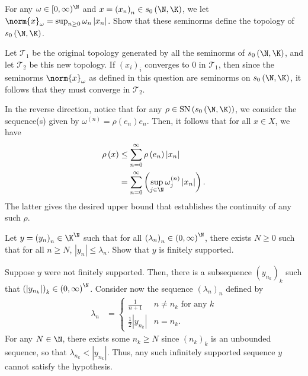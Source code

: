 \documentclass[10pt]{mypackage}
\begin{document}
\begin{problem}[Problem II.6]
  For any $\omega\in [0,\infty)^{\N}$ and $x = \left( x_n \right)_n\in s_0\left( \N,\K \right)$, we let $\norm{x}_{\omega} = \sup_{n\geq 0} \omega_n \left\vert x_n \right\vert$. Show that these seminorms define the topology of $s_0\left( \N,\K \right)$.
\end{problem}
\begin{solution}
  Let $\mathcal{T}_1$ be the original topology generated by all the seminorms of $s_0\left( \N,\K \right)$, and let $\mathcal{T}_2$ be this new topology. If $\left( x_i \right)_i$ converges to $0$ in $\mathcal{T}_1$, then since the seminorms $\norm{x}_{\omega}$ as defined in this question are seminorms on $s_0\left( \N,\K \right)$, it follows that they must converge in $\mathcal{T}_2$.

  In the reverse direction, notice that for any $\rho\in \operatorname{SN}\left( s_0\left( \N,\K \right) \right)$, we consider the sequence(s) given by $\omega^{(n)} = \rho\left( e_n \right)e_n$. Then, it follows that for all $x\in X$, we have
  \begin{align*}
    \rho\left( x \right) &\leq \sum_{n=0}^{\infty}\rho\left( e_n \right)\left\vert x_n \right\vert\\
                         &= \sum_{n=0}^{\infty} \left( \sup_{j\in \N}\omega^{(n)}_j\left\vert x_n \right\vert \right).
  \end{align*}
  The latter gives the desired upper bound that establishes the continuity of any such $\rho$.
\end{solution}
\begin{problem}[Problem II.7]
  Let $y = \left( y_n \right)_n\in \K^{\N}$ such that for all $\left( \lambda_n \right)_n\in \left( 0,\infty \right)^{\N}$, there exists $N\geq 0$ such that for all $n\geq N$, $\left\vert y_n \right\vert\leq \lambda_n$. Show that $y$ is finitely supported.
\end{problem}
\begin{solution}
  Suppose $y$ were not finitely supported. Then, there is a subsequence $\left( y_{n_k} \right)_k$ such that $\left( \left\vert y_{n_k} \right\vert \right)_{k}\in \left( 0,\infty \right)^{\N}$. Consider now the sequence $\left( \lambda_n \right)_n$ defined by
  \begin{align*}
    \lambda_n &= \begin{cases}
      \frac{1}{n+1} & n\neq n_k\text{ for any }k\\
      \frac{1}{2}\left\vert y_{n_k} \right\vert & n = n_k.
    \end{cases}
  \end{align*}
  For any $N\in \N$, there exists some $n_k\geq N$ since $\left( n_k \right)_k$ is an unbounded sequence, so that $\lambda_{n_k} < \left\vert y_{n_k} \right\vert$. Thus, any such infinitely supported sequence $y$ cannot satisfy the hypothesis.
\end{solution}
\end{document}
